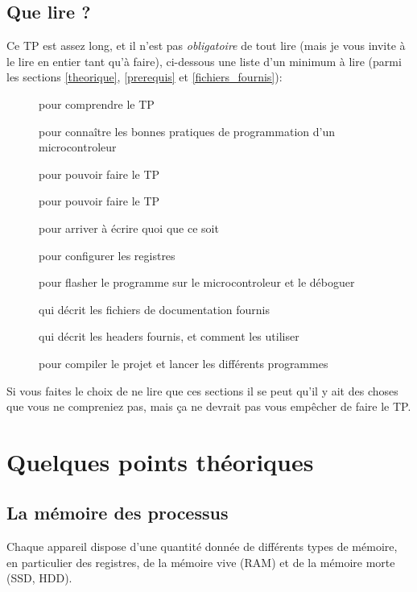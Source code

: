 \documentclass[a4paper,10pt]{article} %
\begin{document}
\subsection{Que lire ?}
Ce TP est assez long, et il n'est pas \textit{obligatoire} de tout lire (mais je vous invite à le lire en entier tant qu'à faire), ci-dessous une liste d'un minimum à lire (parmi les sections \ref*{theorique}, \ref*{prerequis} et \ref*{fichiers_fournis}):
\begin{description}
\item[] pour comprendre le TP
\item[] pour connaître les bonnes pratiques de programmation d'un microcontroleur
\item[] pour pouvoir faire le TP
\item[] pour pouvoir faire le TP
\item[] pour arriver à écrire quoi que ce soit
\item[] pour configurer les registres
\item[] pour flasher le programme sur le microcontroleur et le déboguer
\item[] qui décrit les fichiers de documentation fournis
\item[] qui décrit les headers fournis, et comment les utiliser
\item[] pour compiler le projet et lancer les différents programmes
\end{description}

Si vous faites le choix de ne lire que ces sections il se peut qu'il y ait des choses que vous ne compreniez pas, mais ça ne devrait pas vous empêcher de faire le TP.

\newpage

\section{\label{theorique}Quelques points théoriques}
\subsection{La mémoire des processus}
Chaque appareil dispose d'une quantité donnée de différents types de mémoire, en particulier des registres, de la mémoire vive (RAM) et de la mémoire morte (SSD, HDD).\\
\end{document}

